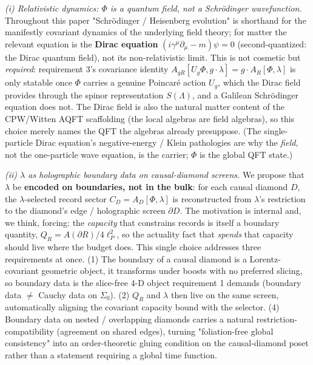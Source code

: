 \documentclass[11pt,a4paper]{article}
\begin{document}
\emph{(i) Relativistic dynamics: $\Phi$ is a quantum field, not a Schrödinger wavefunction.} Throughout this paper "Schrödinger / Heisenberg evolution" is shorthand for the manifestly covariant dynamics of the underlying field theory; for matter the relevant equation is the \textbf{Dirac equation} $(i\gamma^\mu\partial_\mu - m)\psi = 0$ (second-quantized: the Dirac quantum field), not its non-relativistic limit. This is not cosmetic but \emph{required}: requirement 3's covariance identity $A_{gR}[U_g\Phi, g\!\cdot\!\lambda] = g\cdot A_R[\Phi,\lambda]$ is only statable once $\Phi$ carries a genuine Poincaré action $U_g$, which the Dirac field provides through the spinor representation $S(\Lambda)$, and a Galilean Schrödinger equation does not. The Dirac field is also the natural matter content of the CPW/Witten AQFT scaffolding (the local algebras are field algebras), so this choice merely names the QFT the algebras already presuppose. (The single-particle Dirac equation's negative-energy / Klein pathologies are why the \emph{field}, not the one-particle wave equation, is the carrier; $\Phi$ is the global QFT state.)

\emph{(ii) $\lambda$ as holographic boundary data on causal-diamond screens.} We propose that $\lambda$ be \textbf{encoded on boundaries, not in the bulk}: for each causal diamond $D$, the $\lambda$-selected record sector $C_D = A_D[\Phi,\lambda]$ is reconstructed from $\lambda$'s restriction to the diamond's edge / holographic screen $\partial D$. The motivation is internal and, we think, forcing: the \emph{capacity} that constrains records is itself a boundary quantity, $Q_R = A(\partial R)/4\ell_P^2$, so the actuality fact that \emph{spends} that capacity should live where the budget does. This single choice addresses three requirements at once. (1) The boundary of a causal diamond is a Lorentz-covariant geometric object, it transforms under boosts with no preferred slicing, so boundary data is the slice-free 4-D object requirement 1 demands (boundary data $\neq$ Cauchy data on $\Sigma_0$). (2) $Q_R$ and $\lambda$ then live on the same screen, automatically aligning the covariant capacity bound with the selector. (4) Boundary data on nested / overlapping diamonds carries a natural restriction-compatibility (agreement on shared edges), turning "foliation-free global consistency" into an order-theoretic gluing condition on the causal-diamond poset rather than a statement requiring a global time function.
\end{document}
